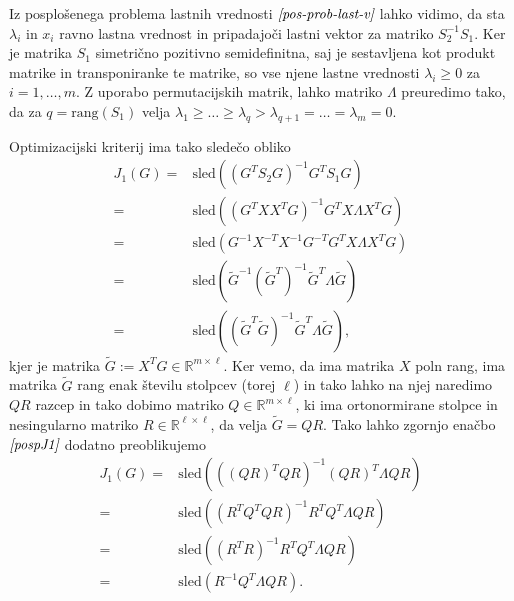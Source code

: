 \documentclass[mat1]{article}
\theoremstyle{definition}
\begin{document}
Iz posplošenega problema lastnih vrednosti $\textit{\eqref{pos-prob-last-v}}$ lahko vidimo, da sta $\lambda_i$ in $x_i$ ravno lastna vrednost in pripadajoči lastni vektor za matriko $S_2^{-1} S_1$. Ker je matrika $S_1$ simetrično pozitivno semidefinitna, saj je sestavljena kot produkt matrike in transponiranke te matrike, so vse njene lastne vrednosti $\lambda_i \geq 0$ za $i = 1, \ldots, m$. Z uporabo permutacijskih matrik, lahko matriko $\Lambda$ preuredimo tako, da za  $q = \text{rang} \left( S_1 \right)$ velja $\lambda_1 \geq \ldots \geq \lambda_q > \lambda_{q+1} = \ldots = \lambda_m = 0$.

Optimizacijski kriterij ima tako sledečo obliko
\begin{equation} \label{pospJ1}
\begin{split}
J_1\left(G\right)
=&
\text{sled} \left( (G^T S_2 G)^{-1} G^T S_1 G \right)
\\
=&
\text{sled} \left( (G^T X X^{T} G)^{-1} G^T X \Lambda X^T G \right)
\\
=&
\text{sled} \left( G^{-1} X^{-T} X^{-1} G^{-T} G^T X \Lambda X^T G \right)
\\
=&
\text{sled} \left( \tilde{G}^{-1} (\tilde{G}^T)^{-1} \tilde{G}^T \Lambda \tilde{G} \right)
\\
= &
\text{sled} \left( (\tilde{G}^T \tilde{G})^{-1} \tilde{G}^T \Lambda \tilde{G} \right)
\text{,} 
\end{split}
\end{equation}
kjer je matrika $\tilde{G} := X^{T} G \in \mathbb{R}^{m \times \ell}$. Ker vemo, da ima matrika $X$ poln rang, ima matrika $\tilde{G}$ rang enak številu stolpcev (torej $\ell$) in tako lahko na njej naredimo $QR$ razcep in tako dobimo matriko $Q \in \mathbb{R}^{m \times \ell}$, ki ima ortonormirane stolpce in nesingularno matriko $R \in \mathbb{R}^{\ell \times \ell}$, da velja $\tilde{G} = QR$. Tako lahko zgornjo enačbo $\textit{\eqref{pospJ1}}$ dodatno preoblikujemo
\begin{equation}
\begin{split}
J_1(G)
=&
\text{sled} \left( ((QR)^T QR)^{-1} (QR)^T \Lambda QR \right)
\\
=&
\text{sled} \left( (R^T Q^T QR)^{-1} R^T Q^T \Lambda QR \right)
\\
=&
\text{sled} \left( (R^T R)^{-1} R^T Q^T \Lambda QR \right)
\nonumber \\
=&
\text{sled} \left( R^{-1} Q^T \Lambda QR \right)
\text{.}
\end{split}
\end{equation}
\end{document}
